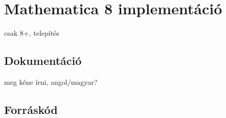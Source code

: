 \section{Mathematica 8 implementáció}
csak 8+, telepítés

\subsection{Dokumentáció}
meg kéne írni, angol/magyar?

\subsection{Forráskód}
\lstset{
	language=Mathematica,
	tabsize=2,
	breaklines=true,
	basicstyle=\footnotesize,
	numbers=left,
	numberstyle=\footnotesize
}

